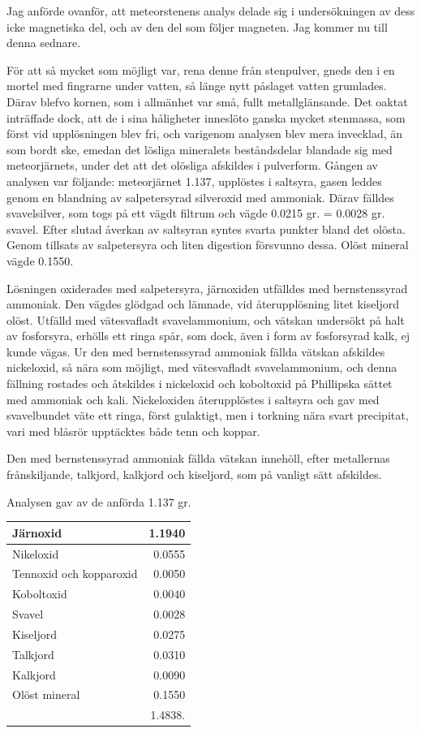 \documentclass[a4paper, 12pt, oneside, swedish]{article}
\begin{document}
Jag anförde ovanför, att meteorstenens analys delade sig i undersökningen av dess icke magnetiska del, och av den del som följer magneten. Jag kommer nu till denna sednare.

För att så mycket som möjligt var, rena denne från stenpulver, gneds den i en mortel med fingrarne under vatten, så länge nytt påslaget vatten grumlades. Därav blefvo kornen, som i allmänhet var små, fullt metallglänsande. Det oaktat inträffade dock, att de i sina håligheter inneslöto ganska mycket stenmassa, som först vid upplösningen blev fri, och varigenom analysen blev mera invecklad, än som bordt ske, emedan det lösliga mineralets beståndsdelar blandade sig med meteorjärnets, under det att det olösliga afskildes i pulverform. Gången av analysen var följande: meteorjärnet 1.137, upplöstes i saltsyra, gasen leddes genom en blandning av salpetersyrad silveroxid med ammoniak. Därav fälldes svavelsilver, som togs på ett vägdt filtrum och vägde 0.0215 gr. = 0.0028 gr. svavel. Efter slutad åverkan av saltsyran syntes svarta punkter bland det olösta. Genom tillsats av salpetersyra och liten digestion försvunno dessa. Olöst mineral vägde 0.1550.

Lösningen oxiderades med salpetersyra, järnoxiden utfälldes med bernstenssyrad ammoniak. Den vägdes glödgad och lämnade, vid återupplösning litet kiseljord olöst. Utfälld med vätesvafladt svavelammonium, och vätskan undersökt på halt av fosforsyra, erhölls ett ringa spår, som dock, även i form av fosforsyrad kalk, ej kunde vägas. Ur den med bernstenssyrad ammoniak fällda vätskan afskildes nickeloxid, så nära som möjligt, med vätesvafladt svavelammonium, och denna fällning rostades och åtskildes i nickeloxid och koboltoxid på Phillipska sättet med ammoniak och kali. Nickeloxiden återupplöstes i saltsyra och gav med svavelbundet väte ett ringa, först gulaktigt, men i torkning nära svart precipitat, vari med blåsrör upptäcktes både tenn och koppar.

Den med bernstenssyrad ammoniak fällda vätskan innehöll, efter metallernas frånskiljande, talkjord, kalkjord och kiseljord, som på vanligt sätt afskildes.

Analysen gav av de anförda 1.137 gr.
\begin{table}[H]
    \centering\small
    \begin{tabular}{|l|r|}
    \hline
        Järnoxid & 1.1940 \\ \hline
        Nikeloxid & 0.0555 \\ \hline
        Tennoxid och kopparoxid & 0.0050 \\ \hline
        Koboltoxid & 0.0040 \\ \hline
        Svavel & 0.0028 \\ \hline
        Kiseljord & 0.0275 \\ \hline
        Talkjord & 0.0310 \\ \hline
        Kalkjord & 0.0090 \\ \hline
        Olöst mineral & 0.1550 \\ \hline
        ~ & 1.4838. \\ \hline
    \end{tabular}
\end{table}
\end{document}
